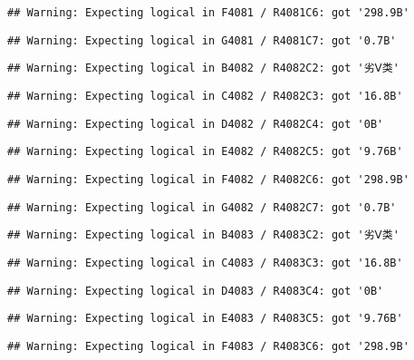 \documentclass[
]{article}
\begin{document}
\begin{verbatim}
## Warning: Expecting logical in F4081 / R4081C6: got '298.9B'
\end{verbatim}

\begin{verbatim}
## Warning: Expecting logical in G4081 / R4081C7: got '0.7B'
\end{verbatim}

\begin{verbatim}
## Warning: Expecting logical in B4082 / R4082C2: got '劣Ⅴ类'
\end{verbatim}

\begin{verbatim}
## Warning: Expecting logical in C4082 / R4082C3: got '16.8B'
\end{verbatim}

\begin{verbatim}
## Warning: Expecting logical in D4082 / R4082C4: got '0B'
\end{verbatim}

\begin{verbatim}
## Warning: Expecting logical in E4082 / R4082C5: got '9.76B'
\end{verbatim}

\begin{verbatim}
## Warning: Expecting logical in F4082 / R4082C6: got '298.9B'
\end{verbatim}

\begin{verbatim}
## Warning: Expecting logical in G4082 / R4082C7: got '0.7B'
\end{verbatim}

\begin{verbatim}
## Warning: Expecting logical in B4083 / R4083C2: got '劣Ⅴ类'
\end{verbatim}

\begin{verbatim}
## Warning: Expecting logical in C4083 / R4083C3: got '16.8B'
\end{verbatim}

\begin{verbatim}
## Warning: Expecting logical in D4083 / R4083C4: got '0B'
\end{verbatim}

\begin{verbatim}
## Warning: Expecting logical in E4083 / R4083C5: got '9.76B'
\end{verbatim}

\begin{verbatim}
## Warning: Expecting logical in F4083 / R4083C6: got '298.9B'
\end{verbatim}
\end{document}
